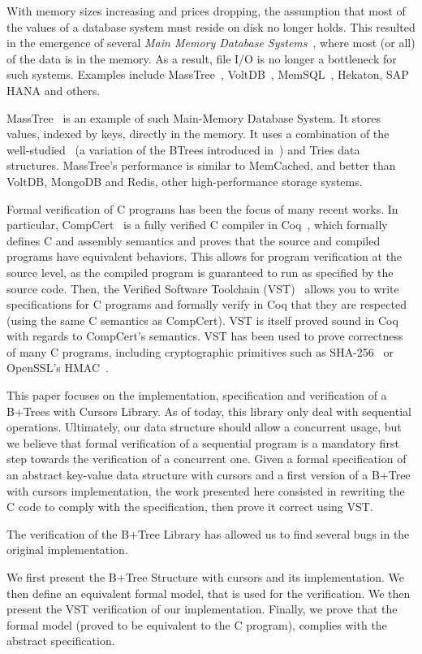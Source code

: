   With memory sizes increasing and prices dropping, the assumption that most of the values of a database system must reside on disk no longer holds.
  This resulted in the emergence of several \textit{Main Memory Database Systems}~\cite{mmdb}, where most (or all) of the data is in the memory.
  As a result, file I/O is no longer a bottleneck for such systems.
  Examples include MassTree~\cite{masstree}, VoltDB~\cite{voltdb}, MemSQL~\cite{memsql}, Hekaton, SAP HANA and others.

  MassTree~\cite{masstree} is an example of such Main-Memory Database System.
  It stores values, indexed by keys, directly in the memory.
  It uses a combination of the well-studied \btrees\ (a variation of the BTrees introduced in~\cite{btrees}) and Tries data structures.
  MassTree's performance is similar to MemCached, and better than VoltDB, MongoDB and Redis, other high-performance storage systems.

  Formal verification of C programs has been the focus of many recent works.
  In particular, CompCert~\cite{compcert,compcert2} is a fully verified C compiler in Coq~\cite{coq}, which formally defines C and assembly semantics and proves that the source and compiled programs have equivalent behaviors.
  This allows for program verification at the source level, as the compiled program is guaranteed to run as specified by the source code.
  Then, the Verified Software Toolchain (VST)~\cite{vst} allows you to write specifications for C programs and formally verify in Coq that they are respected (using the same C semantics as CompCert).
  VST is itself proved sound in Coq with regards to CompCert's semantics.
  VST has been used to prove correctness of many C programs, including cryptographic primitives such as SHA-256~\cite{sha} or OpenSSL's HMAC~\cite{hmac}.

  This paper focuses on the implementation, specification and verification of a B+Trees with Cursors Library.
  As of today, this library only deal with sequential operations.
  Ultimately, our data structure should allow a concurrent usage, but we believe that formal verification of a sequential program is a mandatory first step towards the verification of a concurrent one.
  Given a formal specification of an abstract key-value data structure with cursors and a first version of a B+Tree with cursors implementation, the work presented here consisted in rewriting the C code to comply with the specification, then prove it correct using VST.

  The verification of the B+Tree Library has allowed us to find several bugs in the original implementation.

  We first present the B+Tree Structure with cursors and its implementation.
  We then define an equivalent formal model, that is used for the verification.
  We then present the VST verification of our implementation.
  Finally, we prove that the formal model (proved to be equivalent to the C program), complies with the abstract specification.
